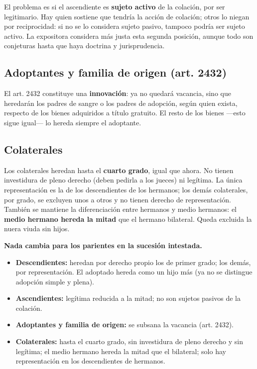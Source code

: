 \documentclass[12pt,oneside]{book}
\begin{document}
El problema es si el ascendiente es \textbf{sujeto activo} de la colación, por ser legitimario. Hay quien sostiene que tendría la acción de colación; otros lo niegan por reciprocidad: si no se lo considera sujeto pasivo, tampoco podría ser sujeto activo. La expositora considera más justa esta segunda posición, aunque todo son conjeturas hasta que haya doctrina y jurisprudencia.

\subsection{Adoptantes y familia de origen (art. 2432)}

El art. 2432 constituye una \textbf{innovación}: ya no quedará vacancia, sino que heredarán los padres de sangre o los padres de adopción, según quien exista, respecto de los bienes adquiridos a título gratuito. El resto de los bienes ---esto sigue igual--- lo hereda siempre el adoptante.

\subsection{Colaterales}

Los colaterales heredan hasta el \textbf{cuarto grado}, igual que ahora. No tienen investidura de pleno derecho (deben pedirla a los jueces) ni legítima. La única representación es la de los descendientes de los hermanos; los demás colaterales, por grado, se excluyen unos a otros y no tienen derecho de representación. También se mantiene la diferenciación entre hermanos y medio hermanos: el \textbf{medio hermano hereda la mitad} que el hermano bilateral. Queda excluida la nuera viuda sin hijos.

\begin{important}
\textbf{Nada cambia para los parientes en la sucesión intestada.}
\begin{itemize}
    \item \textbf{Descendientes:} heredan por derecho propio los de primer grado; los demás, por representación. El adoptado hereda como un hijo más (ya no se distingue adopción simple y plena).
    \item \textbf{Ascendientes:} legítima reducida a la mitad; no son sujetos pasivos de la colación.
    \item \textbf{Adoptantes y familia de origen:} se subsana la vacancia (art. 2432).
    \item \textbf{Colaterales:} hasta el cuarto grado, sin investidura de pleno derecho y sin legítima; el medio hermano hereda la mitad que el bilateral; solo hay representación en los descendientes de hermanos.
\end{itemize}
\end{important}
\end{document}
